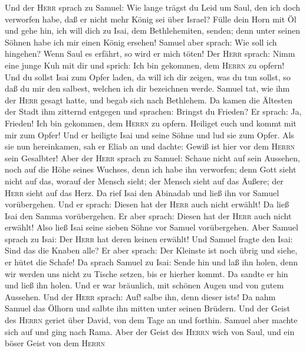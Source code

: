  Und der \textsc{Herr} sprach zu Samuel: Wie lange trägst
du Leid um Saul, den ich doch verworfen habe, daß er nicht mehr König
sei über Israel? Fülle dein Horn mit Öl und gehe hin, ich will dich zu
Isai, dem Bethlehemiten, senden; denn unter seinen Söhnen habe ich mir
einen König ersehen!  Samuel aber sprach: Wie soll ich
hingehen? Wenn Saul es erfährt, so wird er mich töten! Der \textsc{Herr}
sprach: Nimm eine junge Kuh mit dir und sprich: Ich bin gekommen, dem
\textsc{Herrn} zu opfern!  Und du sollst Isai zum Opfer
laden, da will ich dir zeigen, was du tun sollst, so daß du mir den
salbest, welchen ich dir bezeichnen werde.  Samuel tat,
wie ihm der \textsc{Herr} gesagt hatte, und begab sich nach Bethlehem.
Da kamen die Ältesten der Stadt ihm zitternd entgegen und sprachen:
Bringst du Frieden?  Er sprach: Ja, Frieden! Ich bin
gekommen, dem \textsc{Herrn} zu opfern. Heiliget euch und kommt mit mir
zum Opfer! Und er heiligte Isai und seine Söhne und lud sie zum Opfer.
 Als sie nun hereinkamen, sah er Eliab an und dachte:
Gewiß ist hier vor dem \textsc{Herrn} sein Gesalbter! 
Aber der \textsc{Herr} sprach zu Samuel: Schaue nicht auf sein Aussehen,
noch auf die Höhe seines Wuchses, denn ich habe ihn verworfen; denn Gott
sieht nicht auf das, worauf der Mensch sieht; der Mensch sieht auf das
Äußere; der \textsc{Herr} sieht auf das Herz.  Da rief
Isai den Abinadab und ließ ihn vor Samuel vorübergehen. Und er sprach:
Diesen hat der \textsc{Herr} auch nicht erwählt!  Da ließ
Isai den Samma vorübergehen. Er aber sprach: Diesen hat der
\textsc{Herr} auch nicht erwählt!  Also ließ Isai seine
sieben Söhne vor Samuel vorübergehen. Aber Samuel sprach zu Isai: Der
\textsc{Herr} hat deren keinen erwählt!  Und Samuel
fragte den Isai: Sind das die Knaben alle? Er aber sprach: Der Kleinste
ist noch übrig und siehe, er hütet die Schafe! Da sprach Samuel zu Isai:
Sende hin und laß ihn holen, denn wir werden uns nicht zu Tische setzen,
bis er hierher kommt.  Da sandte er hin und ließ ihn
holen. Und er war bräunlich, mit schönen Augen und von gutem Aussehen.
Und der \textsc{Herr} sprach: Auf! salbe ihn, denn dieser
ist\textquotesingle s!  Da nahm Samuel das Ölhorn und
salbte ihn mitten unter seinen Brüdern. Und der Geist des \textsc{Herrn}
geriet über David, von dem Tage an und forthin. Samuel aber machte sich
auf und ging nach Rama.  Aber der Geist des
\textsc{Herrn} wich von Saul, und ein böser Geist von dem \textsc{Herrn}
